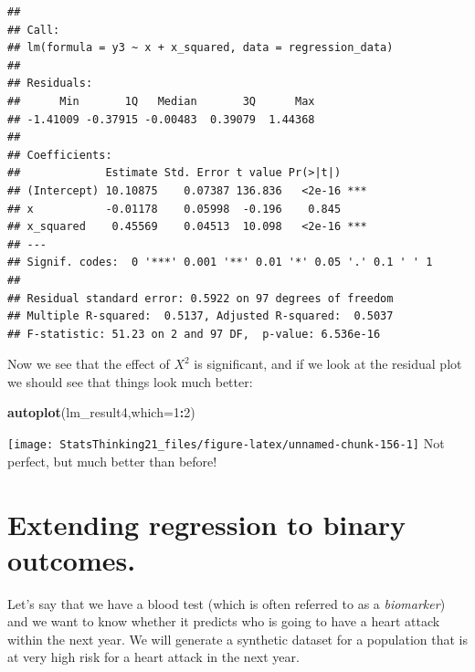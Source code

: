 \documentclass[12pt,]{book}
\newenvironment{Shaded}{\begin{snugshade}}{\end{snugshade}}
\newcommand{\DataTypeTok}[1]{\textcolor[rgb]{0.13,0.29,0.53}{#1}}
\newcommand{\DecValTok}[1]{\textcolor[rgb]{0.00,0.00,0.81}{#1}}
\newcommand{\KeywordTok}[1]{\textcolor[rgb]{0.13,0.29,0.53}{\textbf{#1}}}
\newcommand{\NormalTok}[1]{#1}
\newcommand{\OperatorTok}[1]{\textcolor[rgb]{0.81,0.36,0.00}{\textbf{#1}}}
\begin{document}
\begin{verbatim}
## 
## Call:
## lm(formula = y3 ~ x + x_squared, data = regression_data)
## 
## Residuals:
##      Min       1Q   Median       3Q      Max 
## -1.41009 -0.37915 -0.00483  0.39079  1.44368 
## 
## Coefficients:
##             Estimate Std. Error t value Pr(>|t|)    
## (Intercept) 10.10875    0.07387 136.836   <2e-16 ***
## x           -0.01178    0.05998  -0.196    0.845    
## x_squared    0.45569    0.04513  10.098   <2e-16 ***
## ---
## Signif. codes:  0 '***' 0.001 '**' 0.01 '*' 0.05 '.' 0.1 ' ' 1
## 
## Residual standard error: 0.5922 on 97 degrees of freedom
## Multiple R-squared:  0.5137, Adjusted R-squared:  0.5037 
## F-statistic: 51.23 on 2 and 97 DF,  p-value: 6.536e-16
\end{verbatim}

Now we see that the effect of \(X^2\) is significant, and if we look at the residual plot we should see that things look much better:

\begin{Shaded}
\begin{Highlighting}[]
\KeywordTok{autoplot}\NormalTok{(lm_result4,}\DataTypeTok{which=}\DecValTok{1}\OperatorTok{:}\DecValTok{2}\NormalTok{)}
\end{Highlighting}
\end{Shaded}

\texttt{[image: StatsThinking21\_files/figure-latex/unnamed-chunk-156-1]}
Not perfect, but much better than before!

\hypertarget{extending-regression-to-binary-outcomes.}{%
\section{Extending regression to binary outcomes.}\label{extending-regression-to-binary-outcomes.}}

Let's say that we have a blood test (which is often referred to as a \emph{biomarker}) and we want to know whether it predicts who is going to have a heart attack within the next year. We will generate a synthetic dataset for a population that is at very high risk for a heart attack in the next year.
\end{document}
